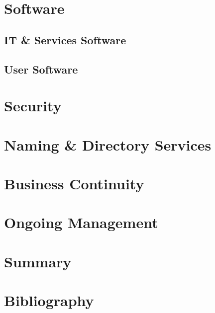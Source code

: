 \documentclass[a4paper, twoside]{article}
\begin{document}
\section{Software}
\subsection{IT \& Services Software}

\subsection{User Software}

\section{Security}
\label{sec:security}

\section{Naming \& Directory Services}

\section{Business Continuity}

\section{Ongoing Management}

\section{Summary}

\section{Bibliography}
\end{document}
